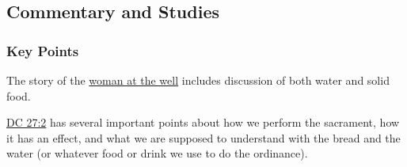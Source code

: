 

	
	
	
	
\subsection{Commentary and Studies} %
	\label{SACRAMENT-COMMENTARY}

	\subsubsection{Key Points}
		\label{SACRAMENT-KEYS}
	
		\begin{compactitem}
			\item The story of the \hyperref[LCHRIST-064-J]{woman at the well} includes discussion of both water and solid food.
			\item \hyperref[DC27-2]{DC 27:2} has several important points about how we perform the sacrament, how it has an effect, and what we are supposed to understand with the bread and the water (or whatever food or drink we use to do the ordinance).
		\end{compactitem}
		

